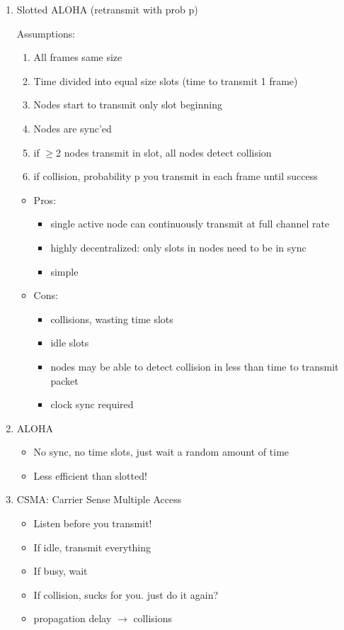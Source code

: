 \documentclass{article}
\begin{document}
\begin{enumerate}
	\item Slotted ALOHA (retransmit with prob p)
	
	Assumptions:
	\begin{enumerate}
		\item All frames same size
		\item Time divided into equal size slots (time to transmit 1 frame)
		\item Nodes start to transmit only slot beginning
		\item Nodes are sync'ed
		\item if $\geq$2 nodes transmit in slot, all nodes detect collision
		\item if collision, probability p you transmit in each frame until success
	\end{enumerate}
	
	\begin{itemize}
		\item Pros:
		\begin{itemize}
			\item single active node can continuously transmit at full channel rate
			\item highly decentralized: only slots in nodes need to be in sync
			\item simple
		\end{itemize}
		\item Cons:
		\begin{itemize}
			\item collisions, wasting time slots
			\item idle slots
			\item nodes may be able to detect collision in less than time to transmit packet
			\item clock sync required
		\end{itemize}
	\end{itemize}
	
	\item ALOHA
	\begin{itemize}
		\item No sync, no time slots, just wait a random amount of time
		\item Less efficient than slotted!
	\end{itemize}
	
	\item CSMA: Carrier Sense Multiple Access
	\begin{itemize}
		\item Listen before you transmit!
		\item If idle, transmit everything
		\item If busy, wait
		\item If collision, sucks for you. just do it again?
		\item propagation delay $\rightarrow$ collisions
	\end{itemize}
	

\end{enumerate}
\end{document}
